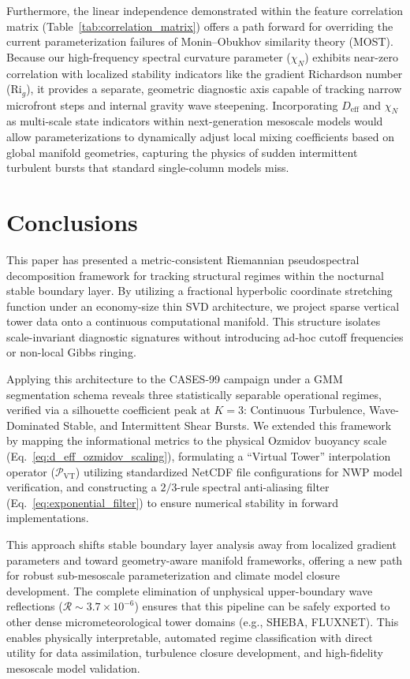 Furthermore, the linear independence demonstrated within the feature correlation matrix (Table~\ref{tab:correlation_matrix}) offers a path forward for overriding the current parameterization failures of Monin--Obukhov similarity theory (MOST). Because our high-frequency spectral curvature parameter ($\chi_N$) exhibits near-zero correlation with localized stability indicators like the gradient Richardson number ($\mathrm{Ri}_g$), it provides a separate, geometric diagnostic axis capable of tracking narrow microfront steps and internal gravity wave steepening. Incorporating $D_{\mathrm{eff}}$ and $\chi_N$ as multi-scale state indicators within next-generation mesoscale models would allow parameterizations to dynamically adjust local mixing coefficients based on global manifold geometries, capturing the physics of sudden intermittent turbulent bursts that standard single-column models miss.

\section{Conclusions}
\label{sec:conclusions}

This paper has presented a metric-consistent Riemannian pseudospectral decomposition framework for tracking structural regimes within the nocturnal stable boundary layer. By utilizing a fractional hyperbolic coordinate stretching function under an economy-size thin SVD architecture, we project sparse vertical tower data onto a continuous computational manifold. This structure isolates scale-invariant diagnostic signatures without introducing ad-hoc cutoff frequencies or non-local Gibbs ringing.

Applying this architecture to the CASES-99 campaign under a GMM segmentation schema reveals three statistically separable operational regimes, verified via a silhouette coefficient peak at $K=3$: Continuous Turbulence, Wave-Dominated Stable, and Intermittent Shear Bursts. We extended this framework by mapping the informational metrics to the physical Ozmidov buoyancy scale (Eq.~\ref{eq:d_eff_ozmidov_scaling}), formulating a ``Virtual Tower'' interpolation operator ($\mathcal{P}_{\mathrm{VT}}$) utilizing standardized NetCDF file configurations for NWP model verification, and constructing a $2/3$-rule spectral anti-aliasing filter (Eq.~\ref{eq:exponential_filter}) to ensure numerical stability in forward implementations.

This approach shifts stable boundary layer analysis away from localized gradient parameters and toward geometry-aware manifold frameworks, offering a new path for robust sub-mesoscale parameterization and climate model closure development. The complete elimination of unphysical upper-boundary wave reflections ($\mathcal{R} \sim 3.7 \times 10^{-6}$) ensures that this pipeline can be safely exported to other dense micrometeorological tower domains (e.g., SHEBA, FLUXNET). This enables physically interpretable, automated regime classification with direct utility for data assimilation, turbulence closure development, and high-fidelity mesoscale model validation.

